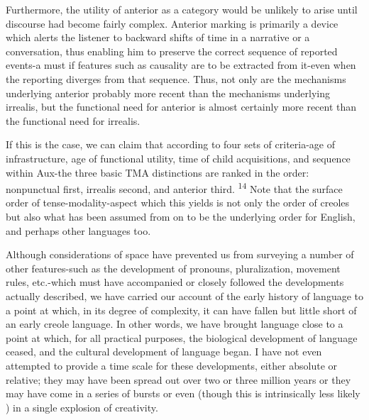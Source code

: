 Furthermore, the utility of anterior as a category would be unlikely to arise until discourse had become fairly complex. Anterior marking is primarily a device which alerts the listener to backward shifts of time in a narrative or a conversation, thus enabling him to preserve the correct sequence of reported events-a must if features such as causality are to be extracted from it-even when the reporting diverges from that sequence. Thus, not only are the mechanisms under\-lying anterior probably more recent than the mechanisms underlying irrealis, but the functional need for anterior is almost certainly more recent than the functional need for irrealis.

If this is the case, we can claim that according to four sets of criteria-age of infrastructure, age of functional utility, time of child acquisitions, and sequence within Aux-the three basic TMA distinc\-tions are ranked in the order: nonpunctual first, irrealis second, and anterior third. \textsuperscript{1}\textsuperscript{4} Note that the surface order of tense-modality-aspect which this yields is not only the order of creoles but also what has been assumed from \citet{Chomsky1957} on to be the underlying order for English, and perhaps other languages too.

Although considerations of space have prevented us from survey\-ing a number of other features-such as the development of pronouns, pluralization, movement rules, etc.-which must have accompanied or closely followed the developments actually described, we have carried our account of the early history of language to a point at which, in its
degree of complexity, it can have fallen but little short of an early creole language. In other words, we have brought language close to a point at which, for all practical purposes, the biological development of language ceased, and the cultural development of language began. I have not even attempted to provide a time scale for these develop\-ments, either absolute or relative; they may have been spread out over two or three million years or they may have come in a series of bursts or even (though this is intrinsically less likely ) in a single explosion of creativity.

